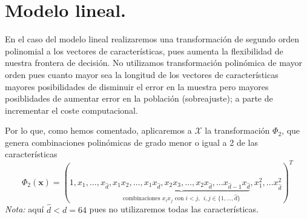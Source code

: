 \documentclass[11pt,a4paper]{article}
\theoremstyle{definition}
\newcommand{\R}{\mathbb{R}}
\begin{document}
	\section{Modelo lineal.}
	En el caso del modelo lineal realizaremos una transformación de segundo orden polinomial a los vectores de características, pues aumenta la flexibilidad de nuestra frontera de decisión. No utilizamos transformación polinómica de mayor orden pues cuanto mayor sea la longitud de los vectores de características mayores posibilidades de disminuir el error en la muestra pero mayores posiblidades de aumentar error en la población (sobreajuste); a parte de incrementar el coste computacional.
	
	Por lo que, como hemos comentado, aplicaremos a  $\mathcal{X}$ la transformación $\Phi_2$, que genera combinaciones polinómicas de grado menor o igual a 2 de las características $$\Phi_2(\mathbf{x})=(1,x_1,\ldots, x_{\hat d},\underbrace{x_1x_2,\ldots ,x_1x_{\hat d},x_2x_3,\ldots ,x_2x_{\hat d},  \ldots
	 x_{\hat d-1}x_{\hat d}}_{\text{combinaciones } x_ix_j \text{ con } i<j,\ \  i,j\in \{1,\ldots , \hat d\}}, x_1^2,\ldots x_{\hat d}^2)^T$$
	\textit{Nota:} aquí $\hat d< d=64$ pues no utilizaremos todas las características.%
	
	
\end{document}
